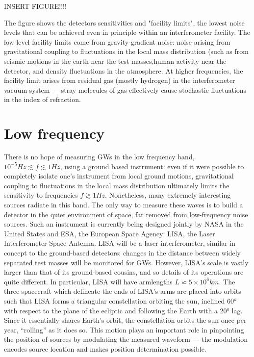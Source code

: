 \documentclass[binding=0.6cm, LaM]{sapthesis}
\begin{document}
INSERT FIGURE!!!!

The figure shows the detectors sensitivities and "facility limits", the lowest noise levels that can be achieved even in principle within an interferometer facility.
The low level facility limits come from gravity-gradient noise: noise arising from gravitational coupling to fluctuations in the local mass distribution (such as from seismic motions in the earth near
 the test masses,human activity near the detector, and density fluctuations in the atmosphere. At higher frequencies, the facility limit arises from residual gas (mostly hydrogen) in the
interferometer vacuum system — stray molecules of gas effectively cause stochastic fluctuations in the index of refraction.

\section{Low frequency}
There is no hope of measuring GWs in the low frequency band, $10^{-5} Hz \apprle f \apprle 1 Hz$, using a ground based instrument: even if it were possible to completely isolate one’s instrument from
local ground motions, gravitational coupling to fluctuations in the local mass distribution ultimately limits the sensitivity to frequencies $f \apprge 1 Hz$.
Nonetheless, many extremely interesting sources radiate in this band.
The only way to measure these waves is to build a detector in the quiet environment of space, far removed from low-frequency noise sources.
Such an instrument is currently being designed jointly by NASA in the United States and ESA, the European Space Agency: LISA, the Laser Interferometer Space Antenna. LISA will be a laser
interferometer, similar in concept to the ground-based detectors: changes in the distance between widely separated test masses will be monitored for GWs.
However, LISA’s scale is vastly larger than that of its ground-based cousins, and so details of its operations are quite different.
In particular, LISA will have armlengths $L \backsimeq 5 \times 10^6 km$. The three spacecraft which delineate the ends of LISA’s arms are placed into orbits such that LISA forms a triangular
constellation orbiting the sun, inclined $\ang{60}$ with respect to the plane of the ecliptic and following the Earth with a $\ang{20}$ lag.
Since it essentially shares Earth’s orbit, the constellation orbits the sun once per year, “rolling” as it does so.
This motion plays an important role in pinpointing the position of sources by modulating the measured waveform — the modulation encodes source location and makes position determination possible.
\end{document}
